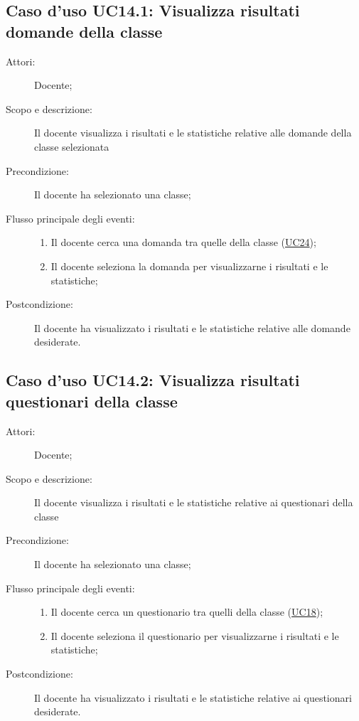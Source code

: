 \subsection{Caso d'uso UC14.1: Visualizza risultati domande della classe}\begin{description}
\item[Attori:] Docente;
\item[Scopo e descrizione:] Il docente visualizza i risultati e le statistiche relative alle domande della classe selezionata
      \item[Precondizione:] Il docente ha selezionato una classe;

        \item[Flusso principale degli eventi:] \begin{enumerate}
          \item Il docente cerca una domanda tra quelle della classe (\hyperlink{UC24}{UC24});
          \item Il docente seleziona la domanda per visualizzarne i risultati e le statistiche;

      \end{enumerate}
    \item[Postcondizione:] Il docente ha visualizzato i risultati e le statistiche relative alle domande desiderate.
  \end{description}
\hypertarget{UC14.2}{}
\subsection{Caso d'uso UC14.2: Visualizza risultati questionari della classe}\begin{description}
\item[Attori:] Docente;
\item[Scopo e descrizione:] Il docente visualizza i risultati e le statistiche relative ai questionari della classe
      \item[Precondizione:] Il docente ha selezionato una classe;

        \item[Flusso principale degli eventi:] \begin{enumerate}
          \item Il docente cerca un questionario tra quelli della classe (\hyperlink{UC18}{UC18});
          \item Il docente seleziona il questionario per visualizzarne i risultati e le statistiche;

      \end{enumerate}
    \item[Postcondizione:] Il docente ha visualizzato i risultati e le statistiche relative ai questionari desiderate.
  \end{description}
\hypertarget{UC14.3}{}
